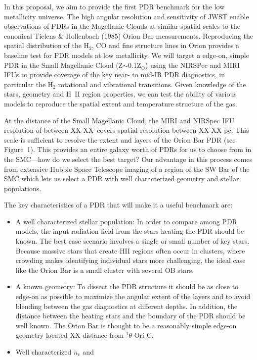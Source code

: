 \documentclass[12pt]{article}
\begin{document}
In this proposal, we aim to provide the first PDR benchmark for the low metallicity universe.  The high angular resolution and sensitivity of JWST enable observations of PDRs in the Magellanic Clouds at similar spatial scales to the canonical Tielens \& Hollenbach (1985) Orion Bar measurements.  Reproducing the spatial distribution of the H$_2$, CO and fine structure lines in Orion provides a baseline test for PDR models at low metallicity.  We will target a edge-on, simple PDR in the Small Magellanic Cloud (Z$\sim$0.1Z$_\odot$) using the NIRSPec and MIRI IFUs to provide coverage of the key near- to mid-IR PDR diagnostics, in particular the H$_2$ rotational and vibrational transitions.  Given knowledge of the stars, geometry and {\sc H~II} region properties, we can test the ability of various models to reproduce the spatial extent and temperature structure of the gas.  

\vspace{0.1in}

 At the distance of the Small Magellanic Cloud, the MIRI and NIRSpec IFU resolution of between XX-XX\arcsec\ covers spatial resolution between XX-XX pc. This scale is sufficient to resolve the extent and layers of the Orion Bar PDR (see Figure~1).  This provides an entire galaxy worth of PDRs for us to choose from in the SMC---how do we select the best target? Our advantage in this process comes from extensive Hubble Space Telescope imaging of a region of the SW Bar of the SMC which lets us select a PDR with well characterized geometry and stellar populations.

The key characteristics of a PDR that will make it a useful benchmark are:
\begin{itemize}
    \item A well characterized stellar population: In order to compare among PDR models, the input radiation field from the stars heating the PDR should be known.  The best case scenario involves a single or small number of key stars. Because massive stars that create {\sc HII} regions often occur in clusters, where crowding makes identifying individual stars more challenging, the ideal case like the Orion Bar is a small cluster with several OB stars.  
    \item A known geometry: To dissect the PDR structure it should be as close to edge-on as possible to maximize the angular extent of the layers and to avoid blending between the gas diagnostics at different depths. In addition, the distance between the heating stars and the boundary of the PDR should be well known. The Orion Bar is thought to be a reasonably simple edge-on geometry located XX distance from $^1\theta$ Ori C.
    \item Well characterized $n_e$ and 
\end{itemize}
\end{document}
